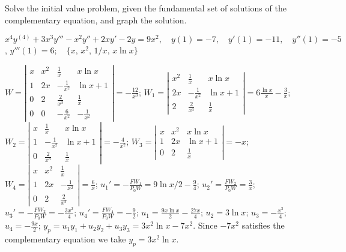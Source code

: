 \documentclass{ximera}
\begin{document}
\begin{problem}\label{exer:9.4.30} Solve the
initial value problem, given the fundamental set of solutions of the complementary equation, and graph the solution.

$x^4y^{(4)}+3x^3y'''-x^2y''+2xy'-2y=9x^2, \quad  y(1)=-7,\quad y'(1)=
-11,\quad y''(1)=-5$,\;
$y'''(1)=6; \quad \{x,\,x^2,\,1/x,\,x\ln x\}$

\begin{solution}
$W=\left|\begin{array}{cccc}
x&x^2&\frac{1}{x}&x\ln x\\1&2x&-\frac{1}{x^2}&\ln x+1\\
0&2&\frac{2}{x^3}&\frac{1}{x}\\0&0&-\frac{6}{x^2}&-\frac{1}{x^2}
\end{array}\right|=-\frac{12}{x^3}$;
$W_1=\left|\begin{array}{cccc}
x^2&\frac{1}{x}&x\ln x\\2x&-\frac{1}{x^2}&\ln x+1\\
2&\frac{2}{x^3}&\frac{1}{x}\end{array}\right|=6\frac{\ln
x}{x}-\frac{3}{x}$;
$W_2=\left|\begin{array}{cccc}
x&\frac{1}{x}&x\ln x\\1&-\frac{1}{x^2}&\ln x+1\\
0&\frac{2}{x^3}&\frac{1}{x}\end{array}\right|=-\frac{4}{x^2}$;
$W_3=\left|\begin{array}{cccc}x&x^2&x\ln x\\
1&2x&\ln x+1\\0&2&\frac{1}{x}\end{array}\right|=-x$;
$W_4=\left|\begin{array}{cccc}
x&x^2&\frac{1}{x}\\1&2x&-\frac{1}{x^2}\\0&2&\frac{2}{x^3}
\end{array}\right|=\frac{6}{x}$;
$u_1'=-\frac{FW_1}{P_0W}=9\ln x/2-\frac{9}{4}$;
$u_2'=\frac{FW_2}{P_0W}=\frac{3}{x}$;
$u_3'=-\frac{FW_2}{P_0W}=-\frac{3x^2}{4}$;
$u_4'=\frac{FW_4}{P_0W}=-\frac{9}{2}$;
$u_1=\frac{9x\ln x}{2}-\frac{27x}{4}$;
$u_2=3\ln x$;
$u_3=-\frac{x^3}{4}$;
$u_4=-\frac{9x}{2}$;
$y_p=u_1y_1+u_2y_2+u_3y_3=3x^2\ln x-7x^2$.
Since $-7x^2$ satisfies the complementary equation we take
$y_p=3x^2\ln x$.


\end{solution}
\end{problem}
\end{document}
